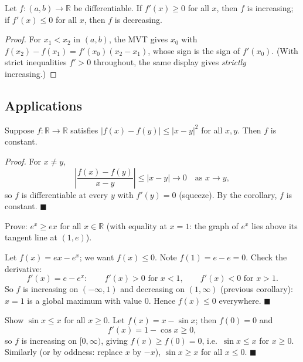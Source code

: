 \documentclass[11pt]{report}
\begin{document}
\begin{corbox}
Let $f: (a,b) \to \mathbb{R}$ be differentiable. If $f'(x) \geq 0$ for all $x$, then $f$ is increasing; if $f'(x) \leq 0$ for all $x$, then $f$ is decreasing.
\end{corbox}

\begin{proof}
For $x_1 < x_2$ in $(a,b)$, the MVT gives $x_0$ with $f(x_2) - f(x_1) = f'(x_0)(x_2 - x_1)$, whose sign is the sign of $f'(x_0)$. (With strict inequalities $f' > 0$ throughout, the same display gives \emph{strictly} increasing.)
\end{proof}

\subsection{Applications}

\begin{exbox}
Suppose $f: \mathbb{R} \to \mathbb{R}$ satisfies $|f(x) - f(y)| \leq |x - y|^2$ for all $x, y$. Then $f$ is constant.

\emph{Proof.} For $x \neq y$,
\[
\left| \frac{f(x) - f(y)}{x - y} \right| \leq |x - y| \longrightarrow 0 \quad \text{as } x \to y,
\]
so $f$ is differentiable at every $y$ with $f'(y) = 0$ (squeeze). By the corollary, $f$ is constant. \hfill $\blacksquare$
\end{exbox}

\begin{exbox}
Prove: $e^x \geq ex$ for all $x \in \mathbb{R}$ (with equality at $x = 1$: the graph of $e^x$ lies above its tangent line at $(1, e)$).

Let $f(x) = ex - e^x$; we want $f(x) \leq 0$. Note $f(1) = e - e = 0$. Check the derivative:
\[
f'(x) = e - e^x: \qquad f'(x) > 0 \text{ for } x < 1, \qquad f'(x) < 0 \text{ for } x > 1.
\]
So $f$ is increasing on $(-\infty, 1)$ and decreasing on $(1, \infty)$ (previous corollary): $x = 1$ is a global maximum with value $0$. Hence $f(x) \leq 0$ everywhere. \hfill $\blacksquare$
\end{exbox}

\begin{exbox}
Show $\sin x \leq x$ for all $x \geq 0$. Let $f(x) = x - \sin x$; then $f(0) = 0$ and
\[
f'(x) = 1 - \cos x \geq 0,
\]
so $f$ is increasing on $[0,\infty)$, giving $f(x) \geq f(0) = 0$, i.e.\ $\sin x \leq x$ for $x \geq 0$. Similarly (or by oddness: replace $x$ by $-x$), $\sin x \geq x$ for all $x \leq 0$. \hfill $\blacksquare$
\end{exbox}
\end{document}
